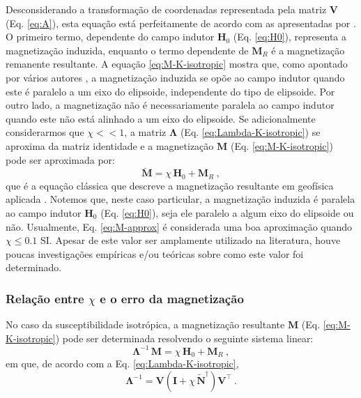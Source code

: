 Desconsiderando a transformação de coordenadas representada pela matriz $\mathbf{V}$ (Eq. \ref{eq:A}),
esta equação está perfeitamente de acordo com as apresentadas por \citet[Eqs. ~13--15]{guo2001}.
O primeiro termo, dependente do campo indutor $\mathbf{H}_{0}$
(Eq. \ref{eq:H0}), 
representa a magnetização induzida, enquanto o termo dependente de
$\mathbf{M}_{R}$ é a magnetização remanente resultante.
A equação \ref{eq:M-K-isotropic} mostra que, como apontado por vários autores
\citep[e.g.,][]{maxwell1873, dubois1896, stoner1945, clark1986, sttraton2007},
a magnetização induzida se opõe ao campo indutor 
quando este é paralelo a um eixo do elipsoide, 
independente do tipo de elipsoide. Por outro lado, a
magnetização não é necessariamente paralela ao campo indutor quando este não está alinhado a um eixo do elipsoide.
Se adicionalmente considerarmos que $\chi << 1$, a matriz
$\mathbf{\Lambda}$ (Eq. \ref{eq:Lambda-K-isotropic})
se aproxima da matriz identidade e a magnetização
$\mathbf{M}$ (Eq. \ref{eq:M-K-isotropic})
pode ser aproximada por:
\begin{equation}
\breve{\mathbf{M}} = \chi \, \mathbf{H}_{0} +
\mathbf{M}_{R} \: ,
\label{eq:M-approx}
\end{equation}
que é a equação clássica que descreve a magnetização resultante em geofísica aplicada \citep[p. ~89]{blakely1996}.
Notemos que, neste caso particular, a magnetização induzida
é paralela ao campo indutor $\mathbf{H}_{0}$ (Eq. \ref{eq:H0}),
seja ele paralelo a algum eixo do elipsoide ou não.
Usualmente, Eq. \ref{eq:M-approx}
é considerada uma boa aproximação quando $\chi \leq 0.1$ SI.
Apesar de este valor ser amplamente utilizado na literatura,
houve poucas investigações empíricas e/ou teóricas sobre como este valor foi determinado.

\subsubsection{Relação entre $\chi$ e o erro da magnetização}

No caso da susceptibilidade isotrópica, a magnetização resultante
$\mathbf{M}$ (Eq. \ref{eq:M-K-isotropic}) pode ser determinada resolvendo o seguinte sistema linear:
\begin{equation}
\mathbf{\Lambda}^{-1} \, \mathbf{M} = \chi \, \mathbf{H}_{0} +
\mathbf{M}_{R} \: ,
\label{eq:M-K-isotropic-inverse-Lambda}
\end{equation}
em que, de acordo com a Eq. \ref{eq:Lambda-K-isotropic},
\begin{equation}
\mathbf{\Lambda}^{-1} = \mathbf{V}
\left( \mathbf{I} + \chi \, \tilde{\mathbf{N}}^{\dagger} \right)
\mathbf{V}^{\top} \: .
\label{eq:inverse-Lambda}
\end{equation}

